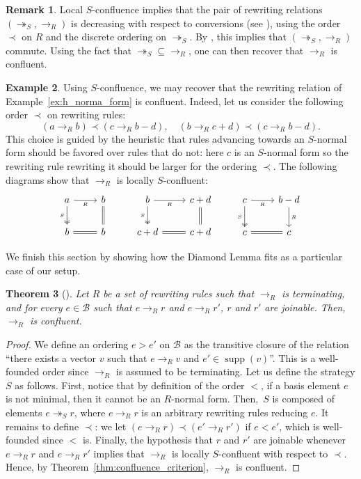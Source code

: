 \documentclass[10pt]{easychair}
\newtheorem{theorem}{Theorem}[section]
\theoremstyle{definition}
\newtheorem{remark}[theorem]{Remark}
\newtheorem{example}[theorem]{Example}
\DeclareMathOperator{\supp}{supp}
\newcommand\basis{\mathscr{B}}
\newcommand\rewR{\to_R}
\newcommand\rewS{\twoheadrightarrow_S}
\begin{document}
\begin{remark}
  Local $S$-confluence implies that the pair of rewriting relations
  $(\rewS,\rewR)$ is decreasing with respect to conversions (see
  \cite[Definition 3]{van2008confluence}), using the order $\prec$ on $R$
  and the discrete ordering on $\rewS$. By
  \cite[Theorem 3]{van2008confluence}, this implies that $(\rewS,\rewR)$
  commute. Using the fact that $\rewS \subseteq \rewR$, one can then
  recover that $\rewR$ is confluent.
\end{remark}
\smallskip

\begin{example}\label{ex:end_to_example}
  Using $S$-confluence, we may recover that the rewriting relation of
  Example~\ref{ex:h_norma_form} is confluent. Indeed, let us consider the
  following order $\prec$ on rewriting rules:
  \[(a\rewR b)\prec(c\rewR b-d),\quad(b\rewR c+d)\prec(c\rewR b-d).\]
  This choice is guided by the heuristic that rules advancing towards an
  $S$-normal form should be favored over rules that do not: here $c$ is
  an $S$-normal form so the rewriting rule rewriting it should be larger
  for the ordering $\prec$.
  The following diagrams show that $\rewR$ is locally $S$-confluent:
  \[\begin{tikzcd}
  a\ar[r, "_R"']\ar[d, twoheadrightarrow, "_S"'] & b\ar[d, equal] & b\ar[r, "_R"']
  \ar[d, twoheadrightarrow, "_S"'] & c+d\ar[d, equal] & c\ar[r, "_R"']\ar[d,
    twoheadrightarrow, "_S"'] & b-d\ar[d, "_R"]\\
  b\ar[r, equal] & b & c+d\ar[r, equal] & c+d & c\ar[r, equal] & c
  \end{tikzcd}\]
\end{example}
\smallskip

We finish this section by showing how the Diamond Lemma fits as a
particular case of our setup.
\medskip

\begin{theorem}[\cite{MR506890}]\label{thm:diamond_lemma}
  Let $R$ be a set of rewriting rules such that $\rewR$ is terminating,
  and for every $e\in\basis$ such that $e\rewR r$ and $e\rewR r'$, $r$
  and $r'$ are joinable. Then,~$\rewR$ is confluent.
\end{theorem}

\begin{proof}
  We define an ordering $e>e'$ on $\basis$ as the transitive closure of
  the relation ``there exists a vector $v$ such that $e\rewR v$ and
  $e'\in\supp(v)$''. This is a well-founded order since $\rewR$ is
  assumed to be terminating. Let us define the strategy $S$ as follows.
  First, notice that by definition of the order $<$, if a basis element
  $e$ is not minimal, then it cannot be an $R$-normal form. Then,~$S$ is
  composed of elements $e\rewS r$, where $e\rewR r$ is an arbitrary
  rewriting rules reducing $e$. It remains to define $\prec$: we let
  $(e\rewR r)\prec(e'\rewR r')$ if $e<e'$, which is well-founded since
  $<$ is. Finally, the hypothesis that $r$ and $r'$ are joinable whenever
  $e\rewR r$ and $e\rewR r'$ implies that $\rewR$ is locally
  $S$-confluent with respect to $\prec$. Hence, by
  Theorem~\ref{thm:confluence_criterion}, $\rewR$ is confluent.   
\end{proof}
\end{document}
